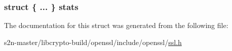 \subsubsection[{\texorpdfstring{stats}{stats}}]{\setlength{\rightskip}{0pt plus 5cm}struct \{ ... \}   stats}\hypertarget{structssl__ctx__st_a1a333453a53af61703f0d3b18aba2681}{}\label{structssl__ctx__st_a1a333453a53af61703f0d3b18aba2681}


The documentation for this struct was generated from the following file\+:\begin{DoxyCompactItemize}
\item 
s2n-\/master/libcrypto-\/build/openssl/include/openssl/\hyperlink{include_2openssl_2ssl_8h}{ssl.\+h}\end{DoxyCompactItemize}
